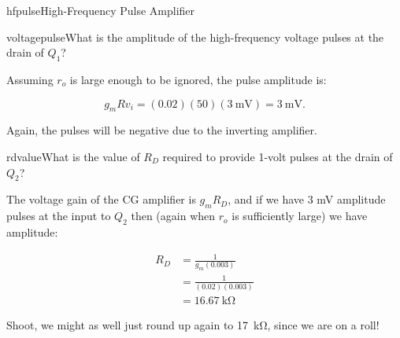 \begin{mainquestion}{hfpulse}{High-Frequency Pulse Amplifier}
\begin{partquestion}{voltagepulse}{What is the amplitude of the high-frequency voltage pulses at the drain of $Q_{1}$?}
\begin{answer}
Assuming $r_{o}$ is large enough to be ignored, the pulse amplitude is:

\[
g_{m} R v_{i} = (0.02)(50)(3\ \text{mV}) = 3\ \text{mV}.
\]

Again, the pulses will be negative due to the inverting amplifier.
\end{answer}
\end{partquestion}

\begin{partquestion}{rdvalue}{What is the value of $R_D$ required to provide 1-volt pulses at the drain of $Q_{2}$?}
\begin{answer}
The voltage gain of the CG amplifier is $g_{m}R_{D}$, and if we have 3 mV amplitude pulses at the input to $Q_2$ then (again when $r_{o}$ is sufficiently large) we have amplitude:

\begin{align*}
    R_D &= \frac{1}{g_m(0.003)} \\
    &= \frac{1}{(0.02)(0.003)} \\
    &= \qty{16.67}{\kilo\ohm}
\end{align*}

Shoot, we might as well just round up again to \qty{17}{\kilo\ohm}, since we are on a roll!

\end{answer}
\end{partquestion}

\end{mainquestion}
